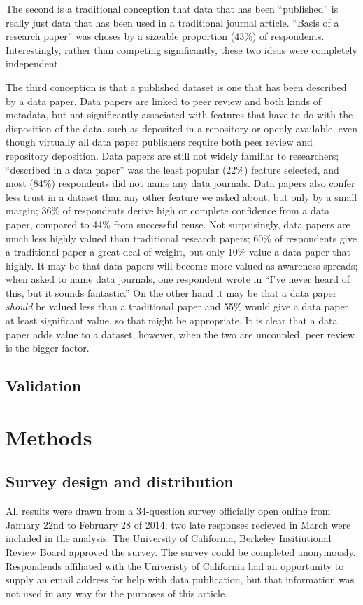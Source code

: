 \documentclass[10pt]{article}
\begin{document}
The second is a traditional conception that data that has been ``published'' is really just data that has been used in a traditional journal article. 
``Basis of a research paper'' was choses by a sizeable proportion (43\%) of respondents.
Interestingly, rather than competing significantly, these two ideas were completely independent.

The third conception is that a published dataset is one that has been described by a data paper.
Data papers are linked to peer review and both kinds of metadata, but not significantly associated with features that have to do with the disposition of the data, such as deposited in a repository or openly available, even though virtually all data paper publishers require both peer review and repository deposition.
Data papers are still not widely familiar to researchers; ``described in a data paper'' was the least popular (22\%) feature selected, and most (84\%) respondents did not name any data journals.
Data papers also confer less trust in a dataset than any other feature we asked about, but only by a small margin; 36\% of respondents derive high or complete confidence from a data paper, compared to 44\% from successful reuse.
Not surprisingly, data papers are much less highly valued than traditional research papers; 60\% of respondents give a traditional paper a great deal of weight, but only 10\% value a data paper that highly.
It may be that data papers will become more valued as awareness spreads; when asked to name data journals, one respondent wrote in ``I've never heard of this, but it sounds fantastic.''
On the other hand it may be that a data paper \emph{should} be valued less than a traditional paper and 55\% would give a data paper at least significant value, so that might be appropriate.
It is clear that a data paper adds value to a dataset, however, when the two are uncoupled, peer review is the bigger factor.
 
\subsection*{Validation}




\section*{Methods}
\subsection*{Survey design and distribution}
All results were drawn from a 34-question survey officially open online from January 22nd to February 28 of 2014; two late responses recieved in March were included in the analysis.
The University of California, Berkeley Insitiutional Review Board approved the survey.
The survey could be completed anonymously.
Respondends affiliated with the Univeristy of California had an opportunity to supply an email address for help with data publication, but that information was not used in any way for the purposes of this article.
\end{document}
